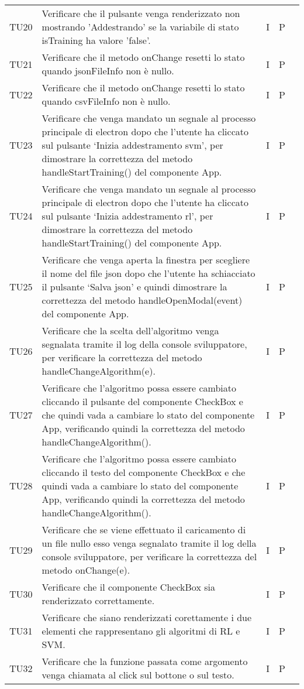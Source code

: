 \begin{longtable} {
		>{}p{15mm} 
		>{}p{79.5mm}
		>{}p{15mm} 
		>{}p{15mm}
		>{}p{0mm}}
	TU20		& Verificare che il pulsante venga renderizzato non mostrando 'Addestrando' se la variabile di stato isTraining ha valore 'false'.& I & P &\TBstrut \\ [2mm]
	TU21		& Verificare che il metodo onChange resetti lo stato quando jsonFileInfo non è nullo.& I & P &\TBstrut \\ [2mm]
	TU22		& Verificare che il metodo onChange resetti lo stato quando csvFileInfo non è nullo.& I & P &\TBstrut \\ [2mm]
	TU23		& Verificare che venga mandato un segnale al processo principale di electron dopo che l’utente ha cliccato sul pulsante ‘Inizia addestramento svm’, per dimostrare la correttezza del metodo handleStartTraining() del componente App.& I & P &\TBstrut \\ [2mm]
	TU24		& Verificare che venga mandato un segnale al processo principale di electron dopo che l’utente ha cliccato sul pulsante ‘Inizia addestramento rl’, per dimostrare la correttezza del metodo handleStartTraining() del componente App.& I & P &\TBstrut \\ [2mm]
	TU25		& Verificare che venga aperta la finestra per scegliere il nome del file json dopo che l’utente ha schiacciato il pulsante ‘Salva json’ e quindi dimostrare la correttezza del metodo handleOpenModal(event) del componente App.& I & P &\TBstrut \\ [2mm]
	TU26		& Verificare che la scelta dell'algoritmo venga segnalata tramite il log della console sviluppatore, per verificare la correttezza del metodo handleChangeAlgorithm(e).& I & P &\TBstrut \\ [2mm]
	TU27		& Verificare che l'algoritmo possa essere cambiato cliccando il pulsante del componente CheckBox e che quindi vada a cambiare lo stato del componente App, verificando quindi la correttezza del metodo handleChangeAlgorithm().& I & P &\TBstrut \\ [2mm]
	TU28		& Verificare che l'algoritmo possa essere cambiato cliccando il testo del componente CheckBox e che quindi vada a cambiare lo stato del componente App, verificando quindi la correttezza del metodo handleChangeAlgorithm().& I & P &\TBstrut \\ [2mm]
	TU29		& Verificare che se viene effettuato il caricamento di un file nullo esso venga segnalato tramite il log della console sviluppatore, per verificare la correttezza del metodo onChange(e).& I & P &\TBstrut \\ [2mm]
	
	TU30		& Verificare che il componente CheckBox sia renderizzato correttamente.& I & P &\TBstrut \\ [2mm]
	TU31		& Verificare che siano renderizzati corettamente i due elementi che rappresentano gli algoritmi di RL e SVM.& I & P &\TBstrut \\ [2mm]
	TU32		& Verificare che la funzione passata come argomento venga chiamata al click sul bottone o sul testo.& I & P &\TBstrut \\ [2mm]
	

\end{longtable}
